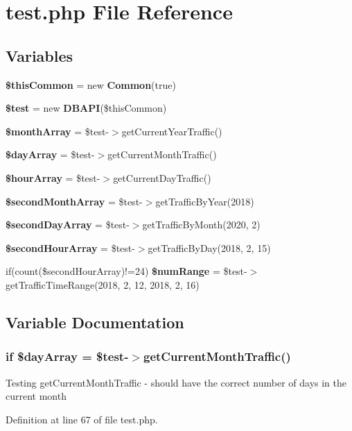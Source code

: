 \section{test.\+php File Reference}
\label{test_8php}
\subsection*{Variables}
\begin{DoxyCompactItemize}
\item 
{\bf \$this\+Common} = new {\bf Common}(true)
\item 
{\bf \$test} = new {\bf D\+B\+A\+PI}(\$this\+Common)
\item 
{\bf \$month\+Array} = \$test-\/$>$get\+Current\+Year\+Traffic()
\item 
{\bf \$day\+Array} = \$test-\/$>$get\+Current\+Month\+Traffic()
\item 
{\bf \$hour\+Array} = \$test-\/$>$get\+Current\+Day\+Traffic()
\item 
{\bf \$second\+Month\+Array} = \$test-\/$>$get\+Traffic\+By\+Year(2018)
\item 
{\bf \$second\+Day\+Array} = \$test-\/$>$get\+Traffic\+By\+Month(2020, 2)
\item 
{\bf \$second\+Hour\+Array} = \$test-\/$>$get\+Traffic\+By\+Day(2018, 2, 15)
\item 
if(count(\$second\+Hour\+Array)!=24) {\bf \$num\+Range} = \$test-\/$>$get\+Traffic\+Time\+Range(2018, 2, 12, 2018, 2, 16)
\end{DoxyCompactItemize}


\subsection{Variable Documentation}
\subsubsection[{\$day\+Array}]{\setlength{\rightskip}{0pt plus 5cm}if \$day\+Array = \$test-\/$>$get\+Current\+Month\+Traffic()}\label{test_8php_a91cb99eedc303fe58894b37cdc8a05e2}
Testing get\+Current\+Month\+Traffic -\/ should have the correct number of days in the current month 

Definition at line 67 of file test.\+php.

